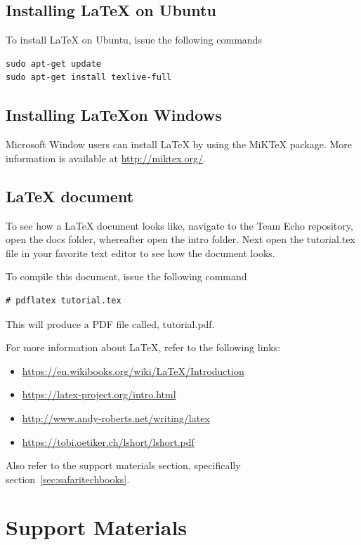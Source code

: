 \documentclass[a4paper,10pt]{article}
\begin{document}
\subsection{Installing \LaTeX{} on Ubuntu}
To install \LaTeX{} on Ubuntu, issue the following commands

\begin{lstlisting}[style=TerminalStyle]
sudo apt-get update
sudo apt-get install texlive-full
\end{lstlisting}


\subsection{Installing \LaTeX on Windows}
Microsoft Window users can install \LaTeX{} by using the MiKTeX package. More information is available at \url{http://miktex.org/}.

\subsection{\LaTeX{} document}
To see how a \LaTeX{} document looks like, navigate to the Team Echo repository, open the docs folder, whereafter open the intro folder. Next open the tutorial.tex file in your favorite text editor to see how the document looks.

To compile this document, issue the following command
\begin{lstlisting}[style=TerminalStyle]
# pdflatex tutorial.tex
\end{lstlisting}

This will produce a PDF file called, tutorial.pdf.

For more information about \LaTeX{}, refer to the following links:

\begin{itemize}
\item \url{https://en.wikibooks.org/wiki/LaTeX/Introduction}
\item \url{https://latex-project.org/intro.html}
\item \url{http://www.andy-roberts.net/writing/latex}
\item \url{https://tobi.oetiker.ch/lshort/lshort.pdf}
\end{itemize}

Also refer to the support materials section, specifically section~\ref{sec:safaritechbooks}.

\section{Support Materials}
\end{document}

